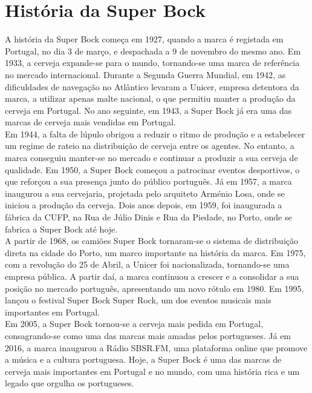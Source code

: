 \chapter*{História da Super Bock}
\label{Chapter1} %

A história da Super Bock começa em 1927, quando a marca é registada em Portugal, no dia 3 de março, e despachada a 9 de novembro do mesmo ano. Em 1933, a cerveja expande-se para o mundo, tornando-se uma marca de referência no mercado internacional. Durante a Segunda Guerra Mundial, em 1942, as dificuldades de navegação no Atlântico levaram a Unicer, empresa detentora da marca, a utilizar apenas malte nacional, o que permitiu manter a produção da cerveja em Portugal. No ano seguinte, em 1943, a Super Bock já era uma das marcas de cerveja mais vendidas em Portugal.\\

Em 1944, a falta de lúpulo obrigou a reduzir o ritmo de produção e a estabelecer um regime de rateio na distribuição de cerveja entre os agentes. No entanto, a marca conseguiu manter-se no mercado e continuar a produzir a sua cerveja de qualidade. Em 1950, a Super Bock começou a patrocinar eventos desportivos, o que reforçou a sua presença junto do público português. Já em 1957, a marca inaugurou a sua cervejaria, projetada pelo arquiteto Arménio Losa, onde se iniciou a produção da cerveja. Dois anos depois, em 1959, foi inaugurada a fábrica da CUFP, na Rua de Júlio Dinis e Rua da Piedade, no Porto, onde se fabrica a Super Bock até hoje.\\

A partir de 1968, os camiões Super Bock tornaram-se o sistema de distribuição direta na cidade do Porto, um marco importante na história da marca. Em 1975, com a revolução do 25 de Abril, a Unicer foi nacionalizada, tornando-se uma empresa pública. A partir daí, a marca continuou a crescer e a consolidar a sua posição no mercado português, apresentando um novo rótulo em 1980. Em 1995, lançou o festival Super Bock Super Rock, um dos eventos musicais mais importantes em Portugal.\\

Em 2005, a Super Bock tornou-se a cerveja mais pedida em Portugal, consagrando-se como uma das marcas mais amadas pelos portugueses. Já em 2016, a marca inaugurou a Rádio SBSR.FM, uma plataforma online que promove a música e a cultura portuguesa. Hoje, a Super Bock é uma das marcas de cerveja mais importantes em Portugal e no mundo, com uma história rica e um legado que orgulha os portugueses.\\



